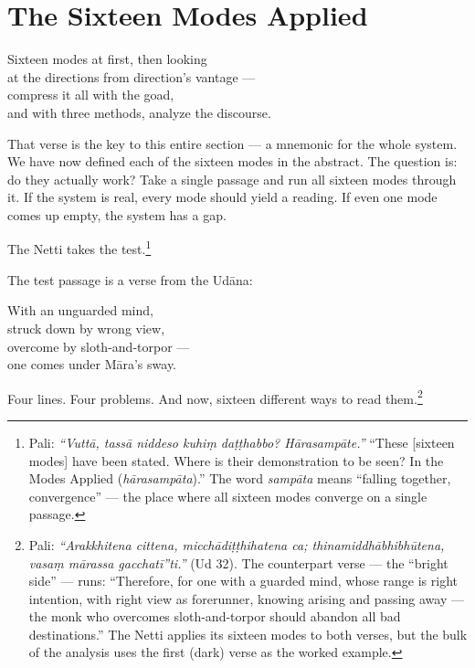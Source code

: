 \chapter{The Sixteen Modes Applied}
\label{ch:modes-applied}

\begin{versebox}
Sixteen modes at first, then looking\\
at the directions from direction's vantage ---\\
compress it all with the goad,\\
and with three methods, analyze the discourse.
\end{versebox}

\noindent That verse is the key to this entire section --- a mnemonic for the whole system. We have now defined each of the sixteen modes in the abstract. The question is: do they actually work? Take a single passage and run all sixteen modes through it. If the system is real, every mode should yield a reading. If even one mode comes up empty, the system has a gap.

The Netti takes the test.\footnote{Pali: \textit{``Vuttā, tassā niddeso kuhiṃ daṭṭhabbo? Hārasampāte.''} ``These [sixteen modes] have been stated. Where is their demonstration to be seen? In the Modes Applied (\textit{hārasampāta}).'' The word \textit{sampāta} means ``falling together, convergence'' --- the place where all sixteen modes converge on a single passage.}

The test passage is a verse from the Udāna:

\begin{versebox}
With an unguarded mind,\\
struck down by wrong view,\\
overcome by sloth-and-torpor ---\\
one comes under Māra's sway.
\end{versebox}

Four lines. Four problems. And now, sixteen different ways to read them.\footnote{Pali: \textit{``Arakkhitena cittena, micchādiṭṭhihatena ca; thinamiddhābhibhūtena, vasaṃ mārassa gacchatī''ti.''} (Ud 32). The counterpart verse --- the ``bright side'' --- runs: ``Therefore, for one with a guarded mind, whose range is right intention, with right view as forerunner, knowing arising and passing away --- the monk who overcomes sloth-and-torpor should abandon all bad destinations.'' The Netti applies its sixteen modes to both verses, but the bulk of the analysis uses the first (dark) verse as the worked example.}

